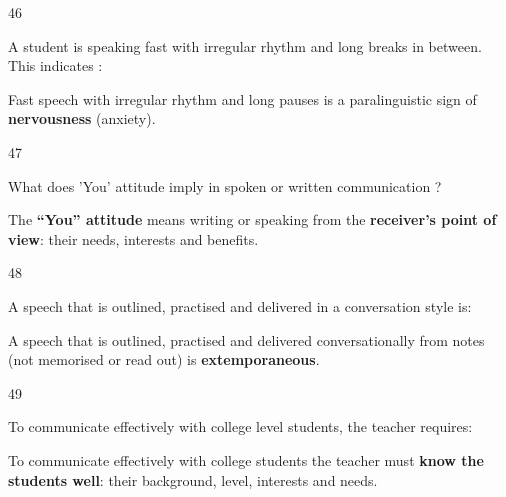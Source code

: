 \begin{question}{46}
{A student is speaking fast with irregular rhythm and long breaks in between. This indicates :\par}
\begin{explain}
Fast speech with irregular rhythm and long pauses is a paralinguistic sign of \textbf{nervousness} (anxiety).
\end{explain}
\end{question}

\begin{question}{47}
{What does 'You' attitude imply in spoken or written communication ?\par}
\begin{explain}
The \textbf{``You'' attitude} means writing or speaking from the \textbf{receiver's point of view}: their needs, interests and benefits.
\end{explain}
\end{question}

\begin{question}{48}
{A speech that is outlined, practised and delivered in a conversation style is:\par}
\begin{explain}
A speech that is outlined, practised and delivered conversationally from notes (not memorised or read out) is \textbf{extemporaneous}.
\end{explain}
\end{question}

\begin{question}{49}
{To communicate effectively with college level students, the teacher requires:\par}
\begin{explain}
To communicate effectively with college students the teacher must \textbf{know the students well}: their background, level, interests and needs.
\end{explain}
\end{question}

